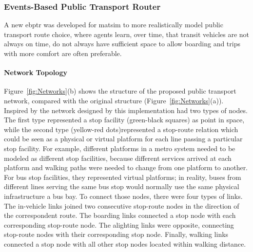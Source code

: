 \subsubsection{Events-Based Public Transport Router} 
\label{sec:RouterStructure}
A new \gls{ebptr} was developed for \gls{matsim} to more realistically model public transport route choice, where agents learn, over time, that transit vehicles are not always on time, do not always have sufficient space to allow boarding and trips with more comfort are often preferable.

\paragraph{Network Topology}

Figure~\ref{fig:Networks}(b) shows the structure of the proposed public transport network, compared with the original structure (Figure~\ref{fig:Networks}(a)). Inspired by the network designed by \citet{SpiessFlorian_TransResB_1989} this implementation had two types of nodes. The first type represented a stop facility (green-black squares) as point in space, while the second type (yellow-red dots)represented a stop-route relation which could be seen as a physical or virtual platform for each line  passing a particular stop facility. For example, different platforms in a metro system needed to be modeled as different stop facilities, because different services arrived at each platform and walking paths were needed to change from one platform to another. For bus stop facilities, they represented virtual platforms; in reality, buses from different lines serving the same bus stop would normally use the same physical infrastructure \eg a bus bay. To connect those nodes, there were four types of links. The in-vehicle links joined two consecutive stop-route nodes in the direction of the correspondent route. The boarding links connected a stop node with each corresponding stop-route node. The alighting links were opposite, connecting stop-route nodes with their corresponding stop node. Finally, walking links connected a stop node with all other stop nodes located within walking distance.

